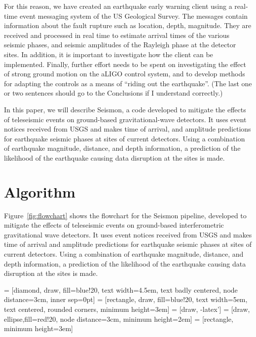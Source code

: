 \documentclass[reprint, prl, aps, showpacs]{revtex4-1}
\newcommand{\rednote}[1]{{\color{red} (#1)}}
\newcommand{\seismon}{\textnormal{Seismon }}
\begin{document}
For this reason, we have created an earthquake early warning client using a real-time event messaging system of the US Geological Survey. The messages contain information about the fault rupture such as location, depth, magnitude. They are received and processed in real time to estimate arrival times of the various seismic phases, and seismic amplitudes of the Rayleigh phase at the detector sites. In addition, it is important to investigate how the client can be implemented. Finally, further effort needs to be spent on investigating the effect of strong ground motion on the aLIGO control system, and to develop methods for adapting the controls as a means of ``riding out the earthquake''. \rednote{The last one or two sentences should go to the Conclusions if I understand correctly.}

In this paper, we will describe Seismon, a code developed to mitigate the effects of teleseismic events on ground-based gravitational-wave detectors. It uses event notices received from USGS and makes time of arrival, and amplitude predictions for earthquake seismic phases at sites of current detectors. Using a combination of earthquake magnitude, distance, and depth information, a prediction of the likelihood of the earthquake causing data disruption at the sites is made.

\section{Algorithm}
\label{sec:algorithm}

Figure~\ref{fig:flowchart} shows the flowchart for the \seismon pipeline, developed to mitigate the effects of teleseismic events on ground-based interferometric gravitational wave detectors. It uses event notices received from USGS and makes time of arrival and amplitude predictions for earthquake seismic phases at sites of current detectors. Using a combination of earthquake magnitude, distance, and depth information, a prediction of the likelihood of the earthquake causing data disruption at the sites is made.

 = [diamond, draw, fill=blue!20,
    text width=4.5em, text badly centered, node distance=3cm, inner sep=0pt]
 = [rectangle, draw, fill=blue!20,
    text width=5em, text centered, rounded corners, minimum height=3em]
 = [draw, -latex']
 = [draw, ellipse,fill=red!20, node distance=3cm,
    minimum height=2em]
 = [rectangle, minimum height=3em]
\end{document}
